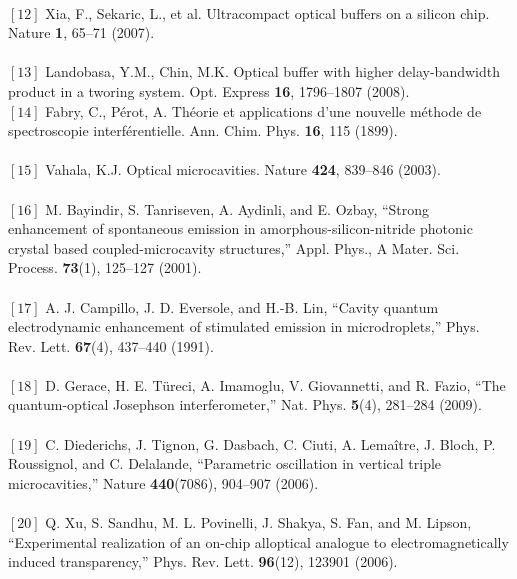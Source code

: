 {\\$[12]$ Xia, F., Sekaric, L., et al. Ultracompact optical buffers on a silicon chip. Nature \textbf{1}, 65–71
(2007).\\
\\$[13]$ Landobasa, Y.M., Chin, M.K. Optical buffer with higher delay-bandwidth product in a tworing system. Opt. Express \textbf{16}, 1796–1807 (2008).
\\$[14]$ Fabry, C., Pérot, A. Théorie et applications d’une nouvelle méthode de spectroscopie interférentielle. Ann. Chim. Phys. \textbf{16}, 115 (1899).\\
\\$[15]$ Vahala, K.J. Optical microcavities. Nature \textbf{424}, 839–846 (2003).\\
\\$[16]$ M. Bayindir, S. Tanriseven, A. Aydinli, and E. Ozbay, “Strong enhancement of spontaneous emission in
amorphous-silicon-nitride photonic crystal based coupled-microcavity structures,” Appl. Phys., A Mater. Sci.
Process. \textbf{73}(1), 125–127 (2001).\\
\\$[17]$ A. J. Campillo, J. D. Eversole, and H.-B. Lin, “Cavity quantum electrodynamic enhancement of stimulated
emission in microdroplets,” Phys. Rev. Lett. \textbf{67}(4), 437–440 (1991).\\
\\$[18]$ D. Gerace, H. E. Türeci, A. Imamoglu, V. Giovannetti, and R. Fazio, “The quantum-optical Josephson
interferometer,” Nat. Phys. \textbf{5}(4), 281–284 (2009).\\
\\$[19]$  C. Diederichs, J. Tignon, G. Dasbach, C. Ciuti, A. Lemaître, J. Bloch, P. Roussignol, and C. Delalande,
“Parametric oscillation in vertical triple microcavities,” Nature \textbf{440}(7086), 904–907 (2006).\\
\\$[20]$ Q. Xu, S. Sandhu, M. L. Povinelli, J. Shakya, S. Fan, and M. Lipson, “Experimental realization of an on-chip alloptical analogue to electromagnetically induced transparency,” Phys. Rev. Lett. \textbf{96}(12), 123901 (2006).}